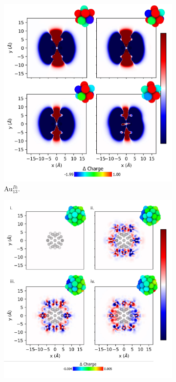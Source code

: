\begin{figure}
\centering
    \begin{subfigure}{0.45\textwidth}
        \includegraphics[width=\textwidth]{figures/LM/Atomistic/Au13_Dense.pdf}
        \caption{Au$_{13}^{Ih}$.}
        \label{fig:Au13_Dense}
    \end{subfigure}
    \begin{subfigure}{0.45\textwidth}
        \includegraphics[width=\textwidth]{figures/LM/Atomistic/Py42_Dense.pdf}

\end{subfigure}
\end{figure}
